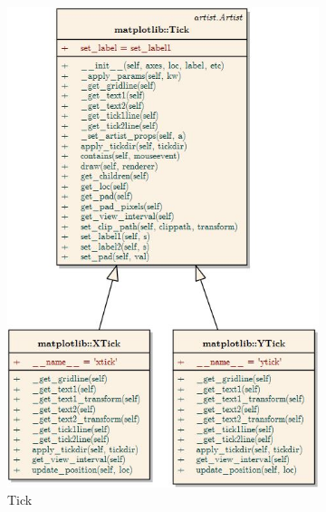 \documentclass[pdftex,10pt,a4paper]{report}
\begin{document}
\begin{figure}[ht!]
        \centering
        \begin{subfigure}[b]{0.3\textwidth}
                \includegraphics[width=\textwidth]{img/umls/pi/tick}
                \caption{Tick}
                \label{fig:histogram}
        \end{subfigure}%
        ~ %
        \begin{subfigure}[b]{0.3\textwidth}

\end{subfigure}
\end{figure}
\end{document}
